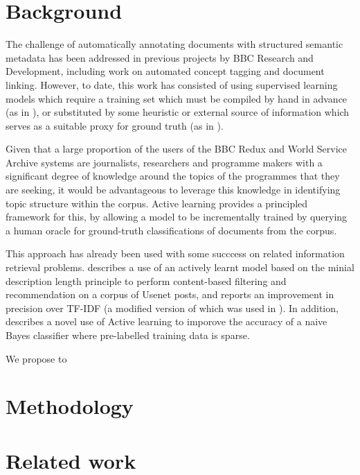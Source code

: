 \documentclass[a4paper, 11pt]{article}
\begin{document}
\section{Background}
\label{sec:Background}
The challenge of automatically annotating documents with structured semantic metadata has been addressed in previous projects by BBC Research and Development, including work on automated concept tagging and  document linking. However, to date, this work has consisted of using supervised learning models which require a training set which must be compiled by hand in advance (as in \cite{Raimond2013}), or substituted by some heuristic or external source of information which serves as a suitable proxy for ground truth (as in \cite{Raimond2012}).

Given that a large proportion of the users of the BBC Redux and World Service Archive systems are journalists, researchers and programme makers with a significant degree of knowledge around the topics of the programmes that they are seeking, it would be advantageous to leverage this knowledge in identifying topic structure within the corpus. Active learning provides a principled framework for this, by allowing a model to be incrementally trained by querying a human oracle for ground-truth classifications of documents from the corpus.

This approach has already been used with some succcess on related information retrieval problems. \cite{Lang1995} describes a use of an actively learnt model based on the minial description length principle to perform content-based filtering and recommendation on a corpus of Usenet posts, and reports an improvement in precision over TF-IDF (a modified version of which was used in \cite{Raimond2012}). In addition, \cite{McCallum1998} describes a novel use of Active learning to imporove the accuracy of a naive Bayes classifier where pre-labelled training data is sparse.

We propose to

\section{Methodology}
\label{sec:Methodology}
\section{Related work}
\label{sec:Related work}
\printbibliography
\end{document}
